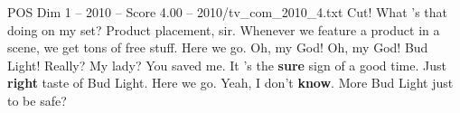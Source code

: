 \begin{textsample}{POS Dim 1 – 2010 – Score 4.00 – 2010/tv\_com\_2010\_4.txt}  \label{ex:f1_pos_068}
Cut!
What 's that doing on my set?
Product placement, sir.
Whenever we feature a product in a scene, we get tons of free stuff.
Here we go.
Oh, my God!
Oh, my God!
Bud Light!
Really?
My lady?
You saved me.
It 's the \textbf{sure} sign of a good time.
Just \textbf{right} taste of Bud Light.
Here we go.
Yeah, I don't \textbf{know}.
More Bud Light just to be safe?

\end{textsample}
